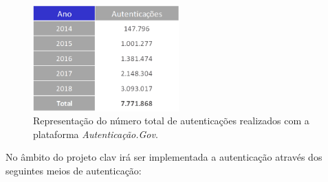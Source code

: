 \begin{figure}[h]
    \centering
    \includegraphics[width=0.5\textwidth]{img/authgov/authAnos.png}
    \caption{Representação do número total de autenticações realizados com a plataforma \emph{Autenticação.Gov}.\cite{authGovStats}}
\end{figure}


No âmbito do projeto \gls{clav} irá ser implementada a autenticação através dos seguintes meios de autenticação:


